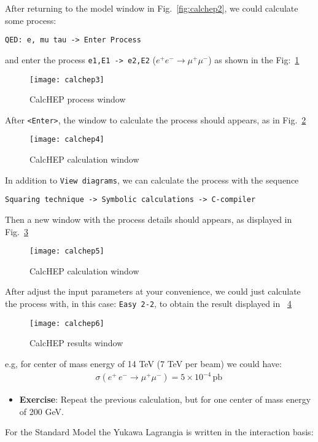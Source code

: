 \begin{frame}{}
After returning to the model window in Fig.~\ref{fig:calchep2}, we could calculate some process:
\begin{lstlisting}
QED: e, mu tau -> Enter Process 
\end{lstlisting}
and enter the process \lstinline{e1,E1 -> e2,E2} ($e^+ e^-\to \mu^+\mu^-$) as shown in the Fig:~\ref{fig:calchep3}
\begin{figure}
  \centering
  \texttt{[image: calchep3]}
  \caption{CalcHEP process window}
  \label{fig:calchep3}
\end{figure}
After \lstinline{<Enter>}, the window to calculate the process should appears, as in Fig.~\ref{fig:calchep4}
\begin{figure}
  \centering
  \texttt{[image: calchep4]}
  \caption{CalcHEP calculation window}
  \label{fig:calchep4}
\end{figure}
In addition to \lstinline{View diagrams}, we can calculate the process with the sequence
\begin{lstlisting}
Squaring technique -> Symbolic calculations -> C-compiler
\end{lstlisting}
Then a new window with the process details should appears, as displayed in Fig.~\ref{fig:calchep5}
\begin{figure}
  \centering
  \texttt{[image: calchep5]}
  \caption{CalcHEP calculation window}
  \label{fig:calchep5}
\end{figure}
After adjust the input parameters at your convenience, we could just calculate the process with, in this case: \lstinline{Easy 2-2}, to obtain the result displayed in ~\ref{fig:calchep6}
\begin{figure}
  \centering
  \texttt{[image: calchep6]}
  \caption{CalcHEP results window}
  \label{fig:calchep6}
\end{figure}
e.g, for center of mass energy of 14 TeV (7 TeV per beam) we could have:
\begin{align}
  \sigma(e^+\,e^-\to \mu^+\mu^-)=5\times 10^{-4}\,\text{pb}\,
\end{align}
\begin{itemize}
\item \textbf{Exercise}:
Repeat the previous calculation, but for one center of mass energy of 200 GeV.
\end{itemize}

For the Standard Model the Yukawa Lagrangia is written in the interaction basis:




\end{frame}


